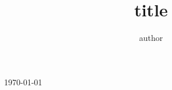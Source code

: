\documentclass[]{article}
\begin{document}
\title{title}
\author{author}

\today
\maketitle
\end{document}
